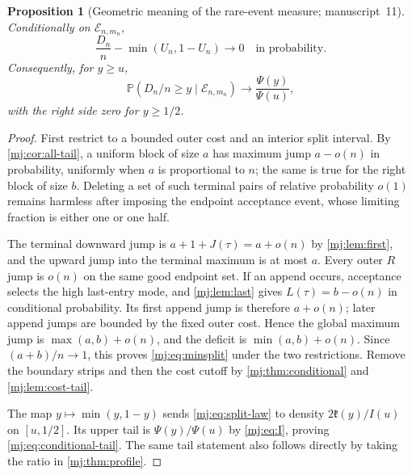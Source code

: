 \documentclass[11pt,a4paper]{article}
\newtheorem{proposition}[proposition]{Proposition}
\theoremstyle{definition}\newaliascnt{definition}{theorem}
\theoremstyle{remark}\newaliascnt{remark}{theorem}
\newcommand{\ljP}{\mathbb P}
\begin{document}
\begin{proposition}[Geometric meaning of the rare-event measure; manuscript~11]
\label{mj:prop:minsplit}
Conditionally on $\mathcal E_{n,m_n}$,
\begin{equation}
 \frac{D_n}{n}-\min(U_n,1-U_n)\longrightarrow0
 \quad\text{in probability}.
 \label{mj:eq:minsplit}
\end{equation}
Consequently, for $y\ge u$,
\begin{equation}
 \ljP(D_n/n\ge y\mid \mathcal E_{n,m_n})\longrightarrow
       \frac{\Psi(y)}{\Psi(u)},
 \label{mj:eq:conditional-tail}
\end{equation}
with the right side zero for $y\ge1/2$.
\end{proposition}
\begin{proof}
First restrict to a bounded outer cost and an interior split interval. By
\cref{mj:cor:all-tail}, a uniform block of size $a$ has maximum jump
$a-o(n)$ in probability, uniformly when $a$ is proportional to $n$; the same
is true for the right block of size $b$. Deleting a set of such terminal
pairs of relative probability $o(1)$ remains harmless after imposing the
endpoint acceptance event, whose limiting fraction is either one or one half.

The terminal downward jump is $a+1+J(\tau)=a+o(n)$ by \cref{mj:lem:first},
and the upward jump into the terminal maximum is at most $a$. Every outer $R$
jump is $o(n)$ on the same good endpoint set. If an append occurs,
acceptance selects the high last-entry mode, and \cref{mj:lem:last} gives
$L(\tau)=b-o(n)$ in conditional probability. Its first append jump is
therefore $a+o(n)$; later append jumps are bounded by the fixed outer cost.
Hence the global maximum jump is $\max(a,b)+o(n)$, and the deficit is
$\min(a,b)+o(n)$. Since $(a+b)/n\to1$, this proves \eqref{mj:eq:minsplit}
under the two restrictions. Remove the boundary strips and then the cost
cutoff by \cref{mj:thm:conditional} and \cref{mj:lem:cost-tail}.

The map $y\mapsto\min(y,1-y)$ sends \eqref{mj:eq:split-law} to density
$2\mathfrak k(y)/I(u)$ on $[u,1/2]$. Its upper tail is $\Psi(y)/\Psi(u)$ by
\eqref{mj:eq:I}, proving \eqref{mj:eq:conditional-tail}. The same tail
statement also follows directly by taking the ratio in
\cref{mj:thm:profile}.
\end{proof}
\end{document}
